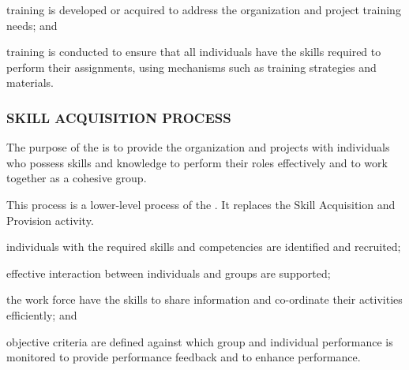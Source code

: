 			\begin{adjustwidth}{2em}{0pt} 

				\begin{compactitem}

					\item training is developed or acquired to address the organization and project training needs; and

					\item training is conducted to ensure that all individuals have the skills required to perform their assignments, using mechanisms such as training strategies and materials.

				\end{compactitem}

			\end{adjustwidth}

		\subsubsection{SKILL ACQUISITION PROCESS\label{llproc:skill_acquisition_process}}

			\begin{adjustwidth}{2em}{0pt} 

				The purpose of the  is to provide the organization and projects with individuals who possess skills and knowledge to perform their roles effectively and to work together as a cohesive group.

				This process is a lower-level process of the . It replaces the Skill Acquisition and Provision activity.

			\end{adjustwidth}

			\begin{adjustwidth}{2em}{0pt} 

				\begin{compactitem}

					\item individuals with the required skills and competencies are identified and recruited;

					\item effective interaction between individuals and groups are supported;

					\item the work force have the skills to share information and co-ordinate their activities efficiently; and

					\item objective criteria are defined against which group and individual performance is monitored to provide performance feedback and to enhance performance.

				\end{compactitem}

			\end{adjustwidth}

